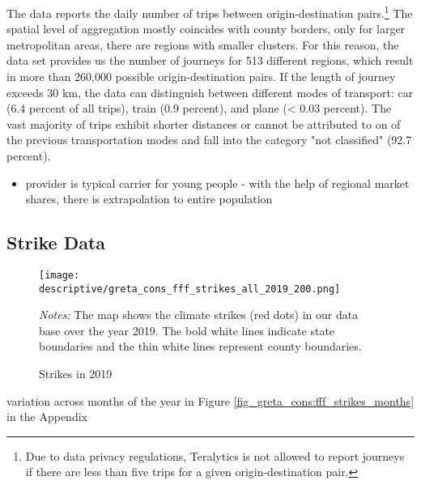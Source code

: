 The data reports the daily number of trips between origin-destination pairs.\footnote{Due to data privacy regulations, Teralytics is not allowed to report journeys if there are less than five trips for a given origin-destination pair.} The spatial level of aggregation mostly coincides with county borders, only for larger metropolitan areas, there are regions with smaller clusters. For this reason, the data set provides us the number of journeys for 513 different regions, which result in more than 260,000 possible origin-destination pairs. If the length of journey exceeds 30 km, the data can distinguish between different modes of transport: car (6.4 percent of all trips), train (0.9 percent), and plane (< 0.03 percent). The vast majority of trips exhibit shorter distances or cannot be attributed to on of the previous transportation modes and fall into the category "not classified" (92.7 percent).






\begin{itemize}
	\item provider is typical carrier for young people - with the help of regional market shares, there is extrapolation to entire population
\end{itemize}






%







\subsection{Strike Data}


\begin{figure}[t]\centering
	\caption{Strikes in 2019}\label{fig_greta_cons:fff_strikes_2019}
	\texttt{[image: descriptive/greta\_cons\_fff\_strikes\_all\_2019\_200.png]}
	\begin{minipage}{0.8\linewidth}
		\scriptsize{\emph{Notes:} The map shows the climate strikes (red dots) in our data base over the year 2019. The bold white lines indicate state boundaries and the thin white lines represent county boundaries.}
	\end{minipage}
\end{figure}

variation across months of the year in Figure \ref{fig_greta_cons:fff_strikes_months} in the Appendix


